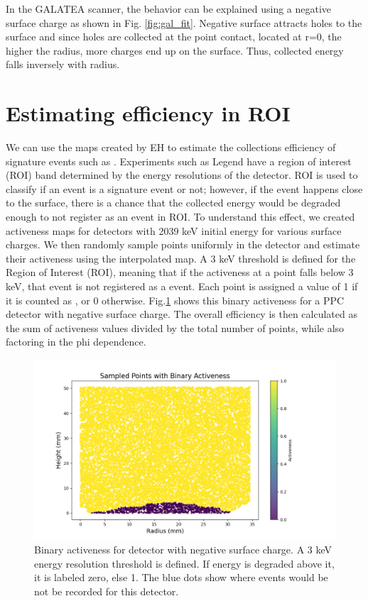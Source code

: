 In the GALATEA scanner, the behavior can be explained using a negative surface charge as shown in Fig. \ref{fig:gal_fit}. Negative surface attracts holes to the surface and since holes are collected at the point contact, located at r=0, the higher the radius, more charges end up on the surface. Thus, collected energy falls inversely with radius.

\section{\label{res:2} Estimating efficiency in ROI}

We can use the maps created by EH to estimate the collections efficiency of signature events such as {\onbb}. Experiments such as Legend have a region of interest (ROI) band determined by the energy resolutions of the detector. ROI is used to classify if an event is a signature event or not; however, if the event happens close to the surface, there is a chance that the collected energy would be degraded enough to not register as an event in ROI. To understand this effect, we created activeness maps for detectors with 2039 keV initial energy for various surface charges. We then randomly sample points uniformly in the detector and estimate their activeness using the interpolated map. A 3 keV threshold is defined for the Region of Interest (ROI), meaning that if the activeness at a point falls below 3 keV, that event is not registered as a {\onbb} event. Each point is assigned a value of 1 if it is counted as {\onbb}, or 0 otherwise. Fig.\ref{ch5_fig_binary_activenss} shows this binary activeness for a PPC detector with negative surface charge. The overall efficiency is then calculated as the sum of activeness values divided by the total number of points, while also factoring in the phi dependence.

\begin{figure}%
\centering
\includegraphics[trim={1.5cm 0cm 6cm 1.77cm},clip,width=0.9\linewidth]{ch5/figs/bianry_act_ponama_1_-0.03.png}
\caption{Binary activeness for {\ponama} detector with negative surface charge. A $3$ keV energy resolution threshold is defined. If energy is degraded above it, it is labeled zero, else 1. The blue dots show where {\onbb} events would be not be recorded for this detector.}
\label{ch5_fig_binary_activenss}
\end{figure}

